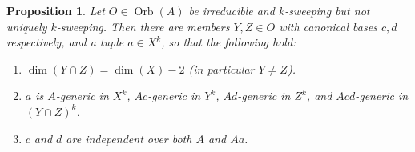 \documentclass{amsart}
\newtheorem{proposition}[theorem]{Proposition}
\theoremstyle{definition}
\begin{document}
\begin{proposition}\label{P: generic witness to non sweeping}
    Let $O\in\operatorname{Orb}(A)$ be irreducible and $k$-sweeping but not uniquely $k$-sweeping. Then there are members $Y,Z\in O$ with canonical bases $c,d$ respectively, and a tuple $a\in X^k$, so that the following hold:
    \begin{enumerate}
        \item $\dim(Y\cap Z)=\dim(X)-2$ (in particular $Y\neq Z$).
        \item $a$ is $A$-generic in $X^k$, $Ac$-generic in $Y^k$, $Ad$-generic in $Z^k$, and $Acd$-generic in $(Y\cap Z)^k$.
        \item $c$ and $d$ are independent over both $A$ and $Aa$.
    \end{enumerate}
\end{proposition}
\end{document}
